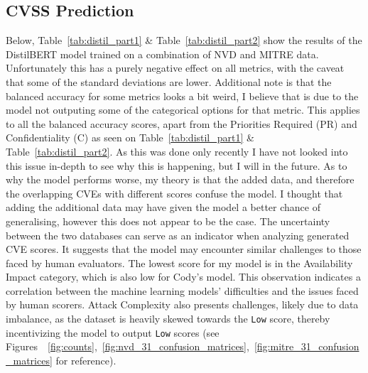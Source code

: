 \documentclass[12pt]{article}
\begin{document}
\subsection{CVSS Prediction}

Below, Table~\ref{tab:distil_part1} \& Table~\ref{tab:distil_part2} show the results of the
DistilBERT model trained on a combination of NVD and MITRE data. Unfortunately this has
a purely negative effect on all metrics, with the caveat that some of the standard deviations are
lower. Additional note is that the balanced accuracy for some metrics looks a bit weird, I believe that
is due to the model not outputing some of the categorical options for that metric. This applies to
all the balanced accuracy scores, apart from the Priorities Required (PR) and Confidentiality (C) as
seen on Table~\ref{tab:distil_part1} \& Table~\ref{tab:distil_part2}. As this
was done only recently I have not looked into this issue in-depth to see why this is happening, but
I will in the future. As to why the model performs worse, my theory is that the added data, and
therefore the overlapping CVEs with different scores confuse the model. I thought that adding the
additional data may have given the model a better chance of generalising, however this
does not appear to be the case.
The uncertainty between the two databases can serve as an indicator when
analyzing generated CVE scores. It suggests that the model may encounter similar challenges to those
faced by human evaluators. The lowest score for my model is in the Availability Impact
category, which is also low for Cody's model. This observation indicates a correlation between the
machine learning models' difficulties and the issues faced by human scorers. Attack Complexity also
presents challenges, likely due to data imbalance, as the dataset is heavily skewed towards the
\texttt{Low} score, thereby incentivizing the model to output \texttt{Low} scores (see
Figures~~\ref{fig:counts},~\ref{fig:nvd_31_confusion_matrices},~\ref{fig:mitre_31_confusion_matrices} for
reference).
\end{document}
